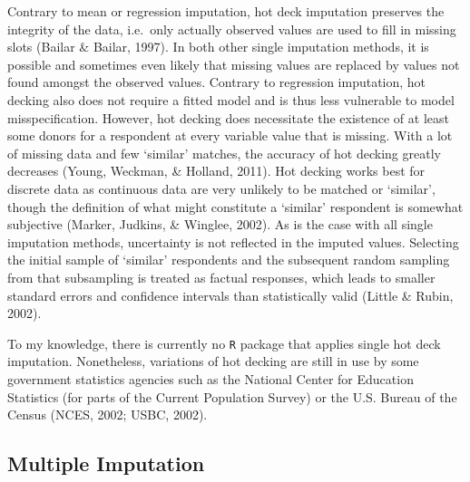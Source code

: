 \documentclass[12pt,econ]{sources/authesis}
\begin{document}
Contrary to mean or regression imputation, hot deck imputation preserves the integrity of the data, i.e.~only actually observed values are used to fill in missing slots (Bailar \& Bailar, 1997). In both other single imputation methods, it is possible and sometimes even likely that missing values are replaced by values not found amongst the observed values. Contrary to regression imputation, hot decking also does not require a fitted model and is thus less vulnerable to model misspecification. However, hot decking does necessitate the existence of at least some donors for a respondent at every variable value that is missing. With a lot of missing data and few `similar' matches, the accuracy of hot decking greatly decreases (Young, Weckman, \& Holland, 2011). Hot decking works best for discrete data as continuous data are very unlikely to be matched or `similar', though the definition of what might constitute a `similar' respondent is somewhat subjective (Marker, Judkins, \& Winglee, 2002). As is the case with all single imputation methods, uncertainty is not reflected in the imputed values. Selecting the initial sample of `similar' respondents and the subsequent random sampling from that subsampling is treated as factual responses, which leads to smaller standard errors and confidence intervals than statistically valid (Little \& Rubin, 2002).

To my knowledge, there is currently no \texttt{R} package that applies single hot deck imputation. Nonetheless, variations of hot decking are still in use by some government statistics agencies such as the National Center for Education Statistics (for parts of the Current Population Survey) or the U.S. Bureau of the Census (NCES, 2002; USBC, 2002).

\hypertarget{ordmiss-theory-multimpute}{%
\subsection{Multiple Imputation}\label{ordmiss-theory-multimpute}}
\end{document}
